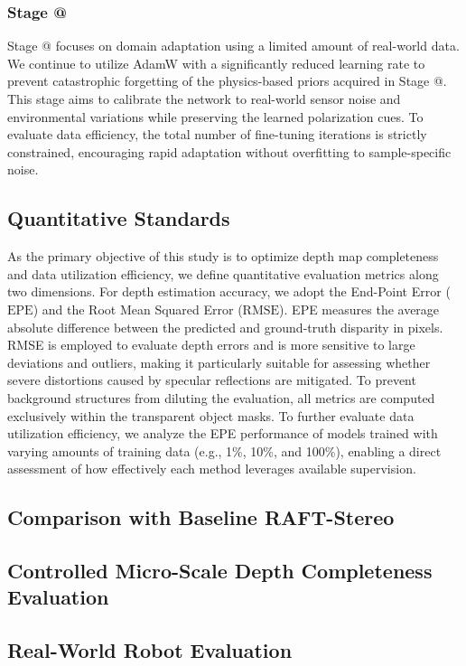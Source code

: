 \documentclass[letterpaper, 10 pt, conference]{ieeeconf}  %
\makeatletter
\newcommand{\Rmnum}[1]{\expandafter\@slowromancap\romannumeral #1@}
\makeatother
\begin{document}
\subsubsection{\textbf{Stage \Rmnum{2}}}
Stage \Rmnum{2} focuses on domain adaptation using a limited amount of real-world data.
We continue to utilize AdamW with a significantly reduced learning rate to prevent catastrophic forgetting of the physics-based priors acquired in Stage \Rmnum{1}.
This stage aims to calibrate the network to real-world sensor noise and environmental variations while preserving the learned polarization cues.
To evaluate data efficiency, the total number of fine-tuning iterations is strictly constrained, encouraging rapid adaptation without overfitting to sample-specific noise.
\subsection{\textbf{Quantitative Standards}}
As the primary objective of this study is to optimize depth map completeness and data utilization efficiency, we define quantitative evaluation metrics along two dimensions.
For depth estimation accuracy, we adopt the End-Point Error ($\mathrm{EPE}$) and the Root Mean Squared Error ($\mathrm{RMSE}$).
EPE measures the average absolute difference between the predicted and ground-truth disparity in pixels.
RMSE is employed to evaluate depth errors and is more sensitive to large deviations and outliers, making it particularly suitable for assessing whether severe distortions caused by specular reflections are mitigated.
To prevent background structures from diluting the evaluation, all metrics are computed exclusively within the transparent object masks.
To further evaluate data utilization efficiency, we analyze the EPE performance of models trained with varying amounts of training data (e.g., 1\%, 10\%, and 100\%), enabling a direct assessment of how effectively each method leverages available supervision.
\subsection{\textbf{Comparison with Baseline RAFT-Stereo}}
\subsection{\textbf{Controlled Micro-Scale Depth Completeness Evaluation}}
\subsection{\textbf{Real-World Robot Evaluation}}
\end{document}
